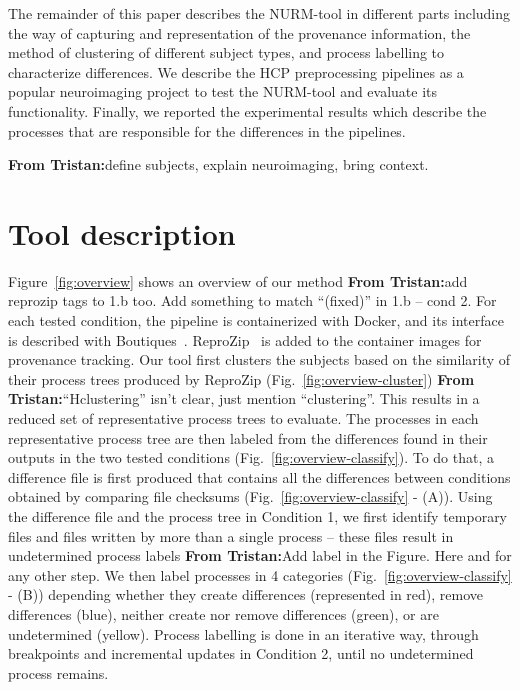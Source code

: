 \documentclass[a4paper,num-refs]{oup-contemporary}
\newcommand{\reprozip}[0]{ReproZip\xspace}
\newcommand{\tristan}[1]{\color{blue}\textbf{From Tristan:}#1\color{black}}
\begin{document}
The remainder of this paper describes the NURM-tool in different parts 
including the way of capturing and representation of the provenance 
information, the method of clustering of different subject types, and 
process labelling to characterize differences. We describe the HCP 
preprocessing pipelines as a popular neuroimaging project to test the 
NURM-tool and evaluate its functionality. Finally, we reported the 
experimental results which describe the processes that are responsible 
for the differences in the pipelines.

\tristan{define subjects, explain neuroimaging, bring context.}
\section{Tool description}

Figure~\ref{fig:overview} shows an overview of our method \tristan{add reprozip
tags to 1.b too. Add something to match ``(fixed)'' in 1.b -- cond 2}. For
each tested condition, the pipeline is containerized with Docker, and its
interface is described with Boutiques~\cite{glatard2017boutiques}.
\reprozip~\cite{Chirigati2016} is added to the container images for
provenance tracking. Our tool first clusters the subjects based on the
similarity of their process trees produced by \reprozip
(Fig.~\ref{fig:overview-cluster}) \tristan{``Hclustering'' isn't clear, just
mention ``clustering''}. This results in a reduced set of representative
process trees to evaluate. The processes in each representative process
tree are then labeled from the differences found in their outputs in the
two tested conditions (Fig.~\ref{fig:overview-classify}). To do that, a
difference file is first produced that contains all the differences between
conditions obtained by comparing file checksums
(Fig.~\ref{fig:overview-classify} - (A)). Using the difference file and the
process tree in Condition 1, we first identify temporary files and files
written by more than a single process -- these files result in undetermined
process labels \tristan{Add label in the Figure. Here and for any other step}.
We then label processes in 4 categories (Fig.~\ref{fig:overview-classify} -
(B)) depending whether they create differences (represented in red), remove
differences (blue), neither create nor remove differences (green), or are
undetermined (yellow). Process labelling is done in an iterative way,
through breakpoints and incremental updates in Condition 2, until no
undetermined process remains.
\end{document}
